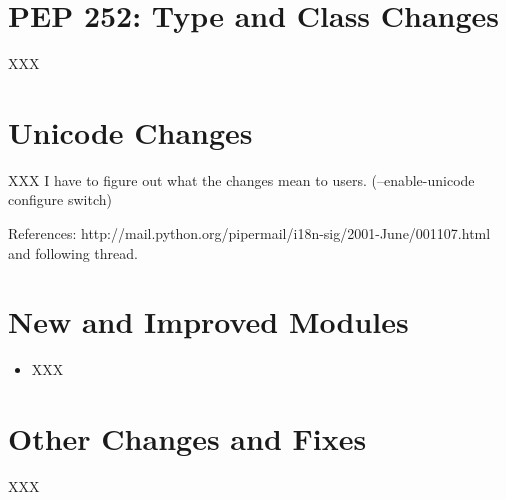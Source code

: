 \documentclass{howto}
\begin{document}
\section{PEP 252: Type and Class Changes}

XXX

\begin{seealso}


\end{seealso}

\section{Unicode Changes}

XXX I have to figure out what the changes mean to users.
(--enable-unicode configure switch)

References: http://mail.python.org/pipermail/i18n-sig/2001-June/001107.html  
and following thread.


\section{New and Improved Modules}

\begin{itemize}

  \item XXX

\end{itemize}


\section{Other Changes and Fixes}

XXX
\end{document}
